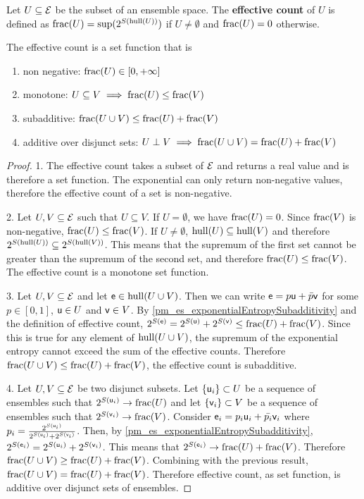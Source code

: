\begin{defn}
	Let $U \subseteq \Ens$ be the subset of an ensemble space. The \textbf{effective count} of $U$ is defined as $\size(U) = \sup(2^{S(\hull(U))})$ if $U \neq \emptyset$ and $\size(U) = 0$ otherwise.
\end{defn}

\begin{prop}
	The effective count is a set function that is
	\begin{enumerate}
		\item non negative: $\size(U) \in [0, +\infty]$
		\item monotone: $U \subseteq V \implies \size(U) \leq \size(V)$
		\item subadditive: $\size(U \cup V) \leq \size(U) + \size(V)$
		\item additive over disjunct sets: $U \disjunct V \implies \size(U \cup V) = \size(U) + \size(V)$ 
	\end{enumerate}
\end{prop}

\begin{proof}
	1. The effective count takes a subset of $\Ens$ and returns a real value and is therefore a set function. The exponential can only return non-negative values, therefore the effective count of a set is non-negative. 
	
	2. Let $U, V \subseteq \Ens$ such that $U \subseteq V$. If $U = \emptyset$, we have $\size(U) = 0$. Since $\size(V)$ is non-negative, $\size(U) \leq \size(V)$. If $U \neq \emptyset$, $\hull(U) \subseteq \hull(V)$ and therefore $2^{S(\hull(U))} \subseteq 2^{S(\hull(V))}$. This means that the supremum of the first set cannot be greater than the supremum of the second set, and therefore $\size(U) \leq \size(V)$. The effective count is a monotone set function.
	
	3. Let $U, V \subseteq \Ens$ and let $\ens \in \hull(U \cup V)$. Then we can write $\ens = p \ens[u] + \bar{p} \ens[v]$ for some $p \in [0,1]$, $\ens[u] \in U$ and $\ens[v] \in V$. By \ref{pm_es_exponentialEntropySubadditivity} and the definition of effective count, $2^{S(\ens)} = 2^{S(\ens[u])} + 2^{S(\ens[v])} \leq \size(U) + \size(V)$. Since this is true for any element of $\hull(U \cup V)$, the supremum of the exponential entropy cannot exceed the sum of the effective counts. Therefore $\size(U \cup V) \leq \size(U) + \size(V)$, the effective count is subadditive.
	
	4. Let $U, V \subseteq \Ens$ be two disjunct subsets. Let $\{\ens[u]_i\} \subset U$ be a sequence of ensembles such that $2^{S(\ens[u]_i)} \to \size(U)$ and let $\{\ens[v]_i\} \subset V$ be a sequence of ensembles such that $2^{S(\ens[v]_i)} \to \size(V)$. Consider $\ens_i = p_i \ens[u]_i + \bar{p_i} \ens[v]_i$ where $p_i = \frac{2^{S(\ens[u]_i)}}{2^{S(\ens[u]_i)} + 2^{S(\ens[v]_i)}}$. Then, by \ref{pm_es_exponentialEntropySubadditivity}, $2^{S(\ens_i)} = 2^{S(\ens[u]_i)} + 2^{S(\ens[v]_i)}$. This means that $2^{S(\ens_i)} \to \size(U) + \size(V)$. Therefore $\size(U \cup V) \geq \size(U) + \size(V)$. Combining with the previous result, $\size(U \cup V) = \size(U) + \size(V)$. Therefore effective count, as set function, is additive over disjunct sets of ensembles.
\end{proof}

